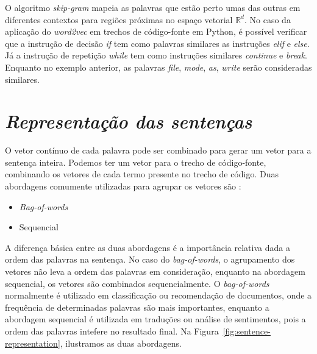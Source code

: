 O algoritmo \textit{skip-gram} mapeia as palavras que estão perto umas das outras em diferentes contextos para regiões próximas no espaço vetorial $\mathbb{R}^{d}$. No caso da aplicação do \textit{word2vec} em trechos de código-fonte em Python, é possível verificar que a instrução de decisão \emph{if} tem como palavras similares as instruções \emph{elif} e \emph{else}. Já a instrução de repetição \emph{while} tem como instruções similares \emph{continue} e \textit{break}. Enquanto no exemplo anterior, as palavras \emph{file}, \emph{mode}, \emph{as}, \emph{write} serão consideradas similares. 


\section{\textit{Representação das sentenças}}
\label{sec:representacao-das-sentencas-fundamentacao-teorica}

O vetor contínuo de cada palavra pode ser combinado para gerar um vetor para a sentença inteira. Podemos ter um vetor para o trecho de código-fonte, combinando os vetores de cada termo presente no trecho de código. Duas abordagens comumente utilizadas para agrupar os vetores são \citep{cambronero-deep-learning-code-search:2019}:

\begin{itemize}
    \item \textit{Bag-of-words}
    \item Sequencial
\end{itemize}

A diferença básica entre as duas abordagens é a importância relativa dada a ordem das palavras na sentença. No caso do \textit{bag-of-words}, o agrupamento dos vetores não leva a ordem das palavras em consideração, enquanto na abordagem sequencial, os vetores são combinados sequencialmente. O \textit{bag-of-words} normalmente é utilizado em classificação ou recomendação de documentos, onde a frequência de determinadas palavras são mais importantes, enquanto a abordagem sequencial é utilizada em traduções ou análise de sentimentos, pois a ordem das palavras intefere no resultado final. Na Figura~\ref{fig:sentence-representation}, ilustramos as duas abordagens.

